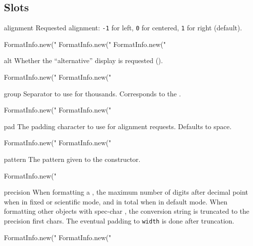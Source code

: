 \subsection{Slots}
\begin{urbiscriptapi}
\item[alignment]
  Requested alignment: \lstinline|-1| for left, \lstinline|0| for
  centered, \lstinline|1| for right (default).
\begin{urbiassert}
FormatInfo.new("%
FormatInfo.new("%
FormatInfo.new("%
\end{urbiassert}

\item[alt]
  Whether the ``alternative'' display is requested (\samp{\#}).
\begin{urbiassert}
FormatInfo.new("%
FormatInfo.new("%
\end{urbiassert}

\item[group]
  Separator to use for thousands.  Corresponds to the 
  .
\begin{urbiassert}
FormatInfo.new("%
FormatInfo.new("%
\end{urbiassert}

\item[pad]
  The padding character to use for alignment requests.  Defaults to space.
\begin{urbiassert}
FormatInfo.new("%
FormatInfo.new("%
\end{urbiassert}

\item[pattern]
  The pattern given to the constructor.
\begin{urbiassert}
FormatInfo.new("%
\end{urbiassert}

\item[precision]
  When formatting a , the maximum number of digits
  after decimal point when in fixed or scientific mode, and in total
  when in default mode.  When formatting other objects with spec-char
  , the conversion string is truncated to the precision first
  chars. The eventual padding to \lstinline|width| is done after
  truncation.
\begin{urbiassert}
FormatInfo.new("%
FormatInfo.new("%
\end{urbiassert}


\end{urbiscriptapi}
